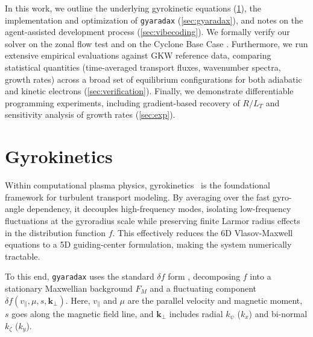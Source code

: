 \documentclass{article}
\theoremstyle{plain}
\theoremstyle{definition}
\theoremstyle{remark}
\begin{document}
In this work, we outline the underlying gyrokinetic equations (\cref{sec:gyrokinetics}), the implementation and optimization of \texttt{gyaradax} (\cref{sec:gyaradax}), and notes on the agent-assisted development process (\cref{sec:vibecoding}).
%
We formally verify our solver on the \citet{Rosenbluth} zonal flow test and on the Cyclone Base Case \cite{cbc}. Furthermore, we run extensive empirical evaluations against GKW \cite{PEETERS_GKW_2009} reference data, comparing statistical quantities (time-averaged transport fluxes, wavenumber spectra, growth rates) across a broad set of equilibrium configurations for both adiabatic and kinetic electrons (\cref{sec:verification}).
%
Finally, we demonstrate differentiable programming experiments, including gradient-based recovery of $R/L_T$ and sensitivity analysis of growth rates (\cref{sec:exp}).




\section{Gyrokinetics}
\label{sec:gyrokinetics}
Within computational plasma physics, gyrokinetics~\citep{frieman1982nonlinear,Krommes_gyrokinetics_2012} is the foundational framework for turbulent transport modeling.
%
By averaging over the fast gyro-angle dependency, it decouples high-frequency modes, isolating low-frequency fluctuations at the gyroradius scale while preserving finite Larmor radius effects in the distribution function $f$. This effectively reduces the 6D Vlasov-Maxwell equations to a 5D guiding-center formulation, making the system numerically tractable.

To this end, \texttt{gyaradax} uses the standard $\delta f$ form \citep{frieman1982nonlinear}, decomposing $f$ into a stationary Maxwellian background $F_M$ and a fluctuating component $\delta f(v_\parallel, \mu, s, \mathbf{k}_\perp)$.
%
Here, $v_\parallel$ and $\mu$ are the parallel velocity and magnetic moment, $s$ goes along the magnetic field line, and $\mathbf{k}_\perp$ includes radial $k_\psi$ ($k_x$) and bi-normal $k_\zeta$ ($k_y$).  
\end{document}
